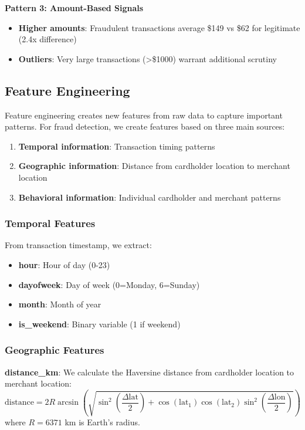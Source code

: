 \textbf{Pattern 3: Amount-Based Signals}
\begin{itemize}
    \item \textbf{Higher amounts}: Fraudulent transactions average \$149 vs \$62 for legitimate (2.4x difference)
    \item \textbf{Outliers}: Very large transactions (>\$1000) warrant additional scrutiny
\end{itemize}

\subsection{Feature Engineering}

Feature engineering creates new features from raw data to capture important patterns. For fraud detection, we create features based on three main sources:
\begin{enumerate}
    \item \textbf{Temporal information}: Transaction timing patterns
    \item \textbf{Geographic information}: Distance from cardholder location to merchant location
    \item \textbf{Behavioral information}: Individual cardholder and merchant patterns
\end{enumerate}

\subsubsection{Temporal Features}

From transaction timestamp, we extract:
\begin{itemize}
    \item \textbf{hour}: Hour of day (0-23)
    \item \textbf{dayofweek}: Day of week (0=Monday, 6=Sunday)
    \item \textbf{month}: Month of year
    \item \textbf{is\_weekend}: Binary variable (1 if weekend)
\end{itemize}

\subsubsection{Geographic Features}

\textbf{distance\_km}: We calculate the Haversine distance from cardholder location to merchant location:
\[\text{distance} = 2R \arcsin\left(\sqrt{\sin^2\left(\frac{\Delta\text{lat}}{2}\right) + \cos(\text{lat}_1) \cos(\text{lat}_2) \sin^2\left(\frac{\Delta\text{lon}}{2}\right)}\right)\]
where $R = 6371$ km is Earth's radius.

